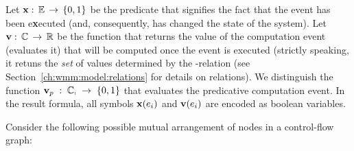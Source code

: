 Let $\mathbf{x}:\,\mathbb{E}\,\rightarrow\,\{0,1\}$ be the predicate that signifies the fact that the event has been e\textbf{x}ecuted (and, consequently, has changed the state of the system).
Let $\mathbf{v}:\,\mathbb{C}\,\rightarrow\,\mathbb{R}$ be the function that returns the value of the computation event (evaluates it) that will be computed once the event is executed (strictly speaking, it retuns the \textit{set} of values determined by the \rf-relation (see Section~\ref{ch:wmm:model:relations} for details on relations).
We distinguish the function ${\mathbf{v}_p\;:\;\mathbb{C_p}\;\rightarrow\;\{0,1\}}$ that evaluates the predicative computation event. In the result formula, all symbols $\mathbf{x}(e_i)$ and $\mathbf{v}(e_i)$ are encoded as boolean variables.

Consider the following possible mutual arrangement of nodes in a control-flow graph:

